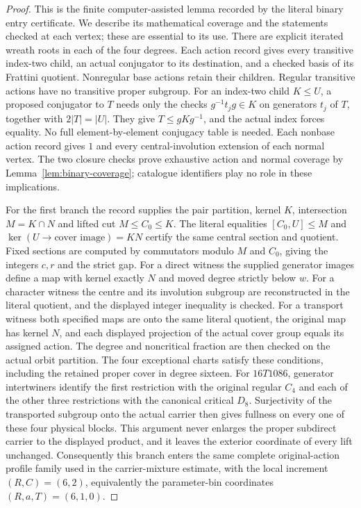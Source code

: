 \begin{proof}
This is the finite computer-assisted lemma recorded by the literal
binary entry certificate. We describe its mathematical coverage and
the statements checked at each vertex; these are essential to its use.
There are explicit iterated wreath roots in each of the four degrees.
Each action record gives every transitive index-two child, an actual
conjugator to its destination, and a checked basis of its Frattini
quotient. Nonregular base actions retain their children. Regular
transitive actions have no transitive proper subgroup.
For an index-two child $K\leq U$, a proposed conjugator to $T$ needs
only the checks $g^{-1}t_jg\in K$ on generators $t_j$ of $T$, together
with $2|T|=|U|$. They give $T\leq gKg^{-1}$, and the actual index
forces equality. No full element-by-element conjugacy table is needed.
Each nonbase action record gives $1$ and every central-involution
extension of each normal vertex. The two closure checks prove exhaustive
action and normal coverage by Lemma~\ref{lem:binary-coverage}; catalogue
identifiers play no role in these implications.

For the first branch the record supplies the pair partition, kernel
$K$, intersection $M=K\cap N$ and lifted cut $M\leq C_0\leq K$.
The literal equalities $[C_0,U]\leq M$ and
$\ker(U\to\text{cover image})=KN$ certify the same central section
and quotient. Fixed sections are computed by commutators modulo
$M$ and $C_0$, giving the integers $c,r$ and the strict gap.
For a direct witness the supplied generator images define a map with
kernel exactly $N$ and moved degree strictly below $w$.
For a character witness the centre and its involution subgroup are
reconstructed in the literal quotient, and the displayed integer
inequality is checked. For a transport witness both specified maps
are onto the same literal quotient, the original map has kernel $N$,
and each displayed projection of the actual cover group equals its
assigned action. The degree and noncritical fraction are then checked
on the actual orbit partition. The four exceptional charts satisfy
these conditions, including the retained proper cover in degree sixteen.
For $16T1086$, generator intertwiners identify the first restriction with
the original regular $C_4$ and each of the other three restrictions with
the canonical critical $D_8$.  Surjectivity of the transported subgroup
onto the actual carrier then gives fullness on every one of these four
physical blocks.  This argument never enlarges the proper subdirect carrier
to the displayed product, and it leaves the exterior coordinate of every
lift unchanged.  Consequently this branch enters the same complete
original-action profile family used in the carrier-mixture estimate, with
the local increment $(R,C)=(6,2)$, equivalently the parameter-bin
coordinates $(R,a,T)=(6,1,0)$.


\end{proof}
